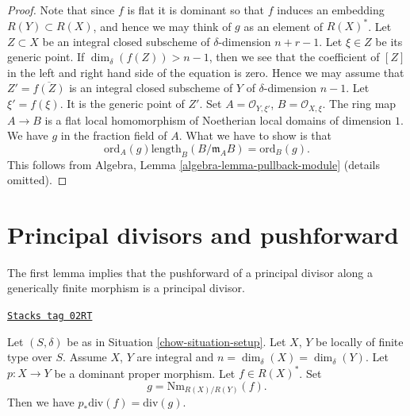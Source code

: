 \begin{proof}
Note that since $f$ is flat it is dominant so that
$f$ induces an embedding $R(Y) \subset R(X)$, and hence
we may think of $g$ as an element of $R(X)^*$.
Let $Z \subset X$ be an integral closed subscheme of
$\delta$-dimension $n + r - 1$. Let $\xi \in Z$
be its generic point. If $\dim_\delta(f(Z)) > n - 1$,
then we see that the coefficient of $[Z]$ in the left and
right hand side of the equation is zero.
Hence we may assume that $Z' = \overline{f(Z)}$ is an
integral closed subscheme of $Y$ of $\delta$-dimension $n - 1$.
Let $\xi' = f(\xi)$. It is the generic point of $Z'$.
Set $A = \mathcal{O}_{Y, \xi'}$, $B = \mathcal{O}_{X, \xi}$.
The ring map $A \to B$ is a flat local homomorphism of
Noetherian local domains of dimension $1$.
We have $g$ in the fraction field of $A$. What we have to show is that
$$
\text{ord}_A(g) \text{length}_B(B/\mathfrak m_AB)
=
\text{ord}_B(g).
$$
This follows from Algebra, Lemma \ref{algebra-lemma-pullback-module}
(details omitted).
\end{proof}

\section{Principal divisors and pushforward}
\label{chow-section-two-fun}
The first lemma implies that the pushforward of a principal
divisor along a generically finite morphism is a principal divisor.

\begin{lemma}
\label{chow-lemma-proper-pushforward-alteration}
\href{https://stacks.math.columbia.edu/tag/02RT}{\texttt{Stacks tag 02RT}}

Let $(S, \delta)$ be as in Situation \ref{chow-situation-setup}.
Let $X$, $Y$ be locally of finite type over $S$. Assume $X$, $Y$
are integral and $n = \dim_\delta(X) = \dim_\delta(Y)$.
Let $p : X \to Y$ be a dominant proper morphism.
Let $f \in R(X)^*$. Set
$$
g = \text{Nm}_{R(X)/R(Y)}(f).
$$
Then we have
$p_*\text{div}(f) = \text{div}(g)$.
\end{lemma}

